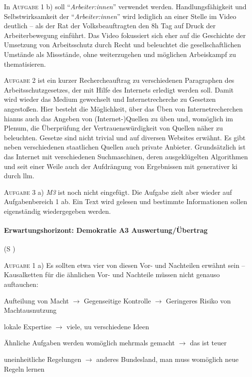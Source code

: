 In \textsc{Aufgabe 1} b) soll \enquote{\emph{Arbeiter:innen}} verwendet werden. Handlungsfähigkeit und Selbstwirksamkeit der \enquote{\emph{Arbeiter:innen}} wird lediglich an einer Stelle im Video deutlich -- als der Rat der Volksbeauftragten den 8h Tag auf Druck der Arbeiterbewegung einführt. Das Video fokussiert sich eher auf die Geschichte der Umsetzung von Arbeitsschutz durch Recht und beleuchtet die gesellschaftlichen Umstände als Missstände, ohne weiterzugehen und möglichen Arbeiskampf zu thematisieren. %

\textsc{Aufgabe 2} ist ein kurzer Rechercheauftrag zu verschiedenen Paragraphen des Arbeitsschutzgesetzes, der mit Hilfe des Internets erledigt werden soll. Damit wird wieder das Medium gewechselt und Internetrecherche zu Gesetzen angestoßen. 
Hier besteht die Möglichkeit, über das Üben von Internetrecherchen hianus auch das Angeben von (Internet-)Quellen zu üben und, womöglich im Plenum, die Überprüfung der Vertrauenswürdigkeit von Quellen näher zu beleuchten. Gesetze sind nicht trivial und auf diversen Websites erwähnt. Es gibt neben verschiedenen staatlichen Quellen auch private Anbieter. Grundsätzlich ist das Internet mit verschiedenen Suchmaschinen, deren ausgeklügelten Algorithmen und seit einer Weile auch der Aufdrängung von Ergebnissen mit generativer \gls{ki} durch \gls{llm}.

\textsc{Aufgabe 3} a) \emph{M3} ist noch nicht eingefügt. Die Aufgabe zielt aber wieder auf Aufgabenbereich 1 ab. Ein Text wird gelesen und bestimmte Informationen sollen eigenständig wiedergegeben werden. 



\paragraph{Erwartungshorizont: Demokratie A3 Auswertung/Übertrag} (\gls{S} \pageref{DEMOKRATIE-A3})

\textsc{Aufgabe 1} a) \quad
Es sollten etwa vier von diesen Vor- und Nachteilen erwähnt sein -- Kausalketten für die ähnlichen Vor- und Nachteile müssen nicht genauso auftauchen:
 \begin{myitemize}
    \item Aufteilung von Macht $\rightarrow$ Gegenseitige Kontrolle $\rightarrow$ Geringeres Risiko von Machtausnutzung
    \item lokale Expertise $\rightarrow$ viele, \gls{uu} verschiedene Ideen
    \item Ähnliche Aufgaben werden womöglich mehrmals gemacht $\rightarrow$ das ist teuer
    \item uneinheitliche Regelungen $\rightarrow$ anderes Bundesland, man muss womöglich neue Regeln lernen
 \end{myitemize}

